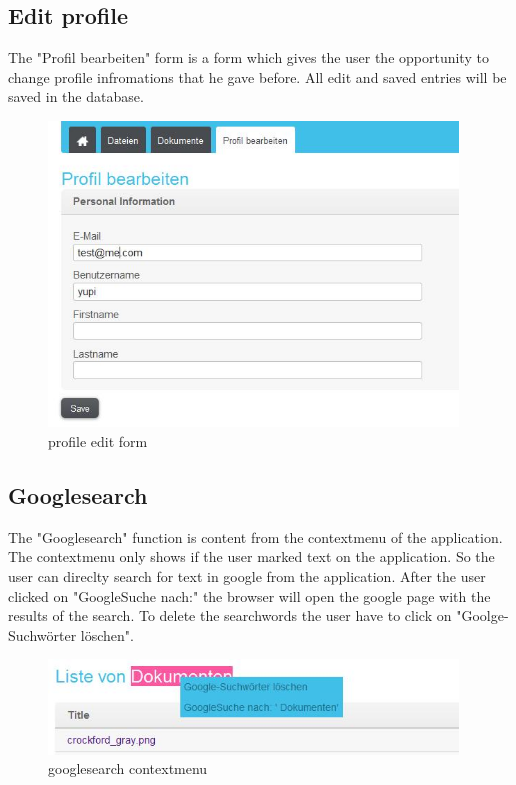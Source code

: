 \subsection{Edit profile}
The "Profil bearbeiten" form is a form which gives the user the opportunity to change profile infromations that he gave before. All edit and saved entries will be saved in the database.
\begin{figure}[!ht]
  \centering
    \includegraphics[width=0.97\textwidth]{images/basic_functionalities/edit_profile.jpg}
  \caption{profile edit form}
  \label{fig: profile edit form}
\end{figure}
\subsection{Googlesearch}
The "Googlesearch" function is content from the contextmenu of the application. The contextmenu only shows if the user marked text on the application. So the user can direclty search for text in google from the application. After the user clicked on "GoogleSuche nach:" the browser will open the google page with the results of the search. To delete the searchwords the user have to click on "Goolge-Suchwörter löschen".
\begin{figure}[!ht]
  \centering
    \includegraphics[width=0.97\textwidth]{images/basic_functionalities/contextmenu.jpg}
  \caption{googlesearch contextmenu}
  \label{fig:contextmenu}
\end{figure}

